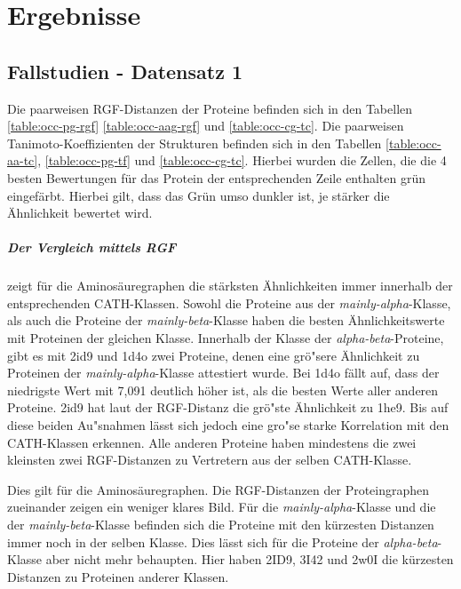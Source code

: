 \documentclass{report}
\begin{document}
\chapter{Ergebnisse}

\section{Fallstudien - Datensatz 1}

Die paarweisen RGF-Distanzen der Proteine befinden sich in den Tabellen \ref{table:occ-pg-rgf} \ref{table:occ-aag-rgf} und \ref{table:occ-cg-tc}. Die paarweisen Tanimoto-Koeffizienten der Strukturen befinden sich in den Tabellen \ref{table:occ-aa-tc}, \ref{table:occ-pg-tf} und \ref{table:occ-cg-tc}.
Hierbei wurden die Zellen, die die 4 besten Bewertungen f\"ur das Protein der entsprechenden Zeile enthalten gr\"un eingef\"arbt. Hierbei gilt, dass das Gr\"un umso dunkler ist, je st\"arker die \"Ahnlichkeit bewertet wird.

\paragraph{Der Vergleich mittels RGF}
zeigt f\"ur die Aminos\"auregraphen die st\"arksten \"Ahnlichkeiten immer innerhalb der entsprechenden CATH-Klassen. Sowohl die Proteine aus der \textit{mainly-alpha}-Klasse, als auch die Proteine der \textit{mainly-beta}-Klasse haben die besten \"Ahnlichkeitswerte mit Proteinen der gleichen Klasse.
Innerhalb der Klasse der \textit{alpha-beta}-Proteine, gibt es mit 2id9 und 1d4o zwei Proteine, denen eine gr\"o"sere \"Ahnlichkeit zu Proteinen der \textit{mainly-alpha}-Klasse attestiert wurde.
Bei 1d4o f\"allt auf, dass der niedrigste Wert mit 7,091 deutlich h\"oher ist, als die besten Werte aller anderen Proteine.
2id9 hat laut der RGF-Distanz die gr\"o"ste \"Ahnlichkeit zu 1he9.
Bis auf diese beiden Au"snahmen l\"asst sich jedoch eine gro"se starke Korrelation mit den CATH-Klassen erkennen.
Alle anderen Proteine haben mindestens die zwei kleinsten zwei RGF-Distanzen zu Vertretern aus der selben CATH-Klasse.

Dies gilt f\"ur die Aminos\"auregraphen. Die RGF-Distanzen der Proteingraphen zueinander zeigen ein weniger klares Bild.
F\"ur die \textit{mainly-alpha}-Klasse und die der \textit{mainly-beta}-Klasse befinden sich die Proteine mit den k\"urzesten Distanzen immer noch in der selben Klasse. Dies l\"asst sich f\"ur die Proteine der \textit{alpha-beta}-Klasse aber nicht mehr behaupten. Hier haben 2ID9, 3I42 und 2w0I die k\"urzesten Distanzen zu Proteinen anderer Klassen.
\end{document}
